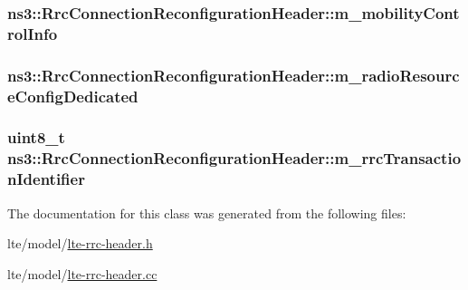 \subsubsection[{\texorpdfstring{m\+\_\+mobility\+Control\+Info}{m_mobilityControlInfo}}]{ ns3\+::\+Rrc\+Connection\+Reconfiguration\+Header\+::m\+\_\+mobility\+Control\+Info\hspace{0.3cm}{\ttfamily [private]}}\hypertarget{classns3_1_1RrcConnectionReconfigurationHeader_a5fcc1f18f57bf3d669b61cfccc625531}{}\label{classns3_1_1RrcConnectionReconfigurationHeader_a5fcc1f18f57bf3d669b61cfccc625531}
\subsubsection[{\texorpdfstring{m\+\_\+radio\+Resource\+Config\+Dedicated}{m_radioResourceConfigDedicated}}]{ ns3\+::\+Rrc\+Connection\+Reconfiguration\+Header\+::m\+\_\+radio\+Resource\+Config\+Dedicated\hspace{0.3cm}{\ttfamily [private]}}\hypertarget{classns3_1_1RrcConnectionReconfigurationHeader_a7010bf4b65c2e3aeb25f889bd16ea10f}{}\label{classns3_1_1RrcConnectionReconfigurationHeader_a7010bf4b65c2e3aeb25f889bd16ea10f}
\subsubsection[{\texorpdfstring{m\+\_\+rrc\+Transaction\+Identifier}{m_rrcTransactionIdentifier}}]{\setlength{\rightskip}{0pt plus 5cm}uint8\+\_\+t ns3\+::\+Rrc\+Connection\+Reconfiguration\+Header\+::m\+\_\+rrc\+Transaction\+Identifier\hspace{0.3cm}{\ttfamily [private]}}\hypertarget{classns3_1_1RrcConnectionReconfigurationHeader_ae6f276694b1b97f017227127d196cd2a}{}\label{classns3_1_1RrcConnectionReconfigurationHeader_ae6f276694b1b97f017227127d196cd2a}


The documentation for this class was generated from the following files\+:\begin{DoxyCompactItemize}
\item 
lte/model/\hyperlink{lte-rrc-header_8h}{lte-\/rrc-\/header.\+h}\item 
lte/model/\hyperlink{lte-rrc-header_8cc}{lte-\/rrc-\/header.\+cc}\end{DoxyCompactItemize}
